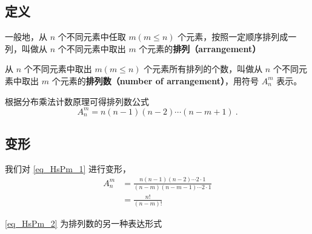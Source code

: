 
\begin{issues}
\end{issues}


\subsection{定义}
一般地，从 $n$ 个不同元素中任取 $m(m \leq n)$ 个元素，按照一定顺序排列成一列，叫做从 $n$ 个不同元素中取出 $m$ 个元素的\textbf{排列（arrangement）}

从 $n$ 个不同元素中取出 $m(m \leq n)$ 个元素所有排列的个数，叫做从 $n$ 个不同元素中取出 $m$ 个元素的\textbf{排列数（number of arrangement）}，用符号 $A_n^m$ 表示。

根据分布乘法计数原理可得排列数公式\begin{equation}\label{eq_HsPm_1}
A_n^m = n (n - 1)(n - 2) \cdots (n - m + 1)~.
\end{equation}

\subsection{变形}
我们对 \autoref{eq_HsPm_1} 进行变形，\begin{equation}\label{eq_HsPm_2}
\begin{aligned}
A_n^m &= \frac{n(n - 1)(n - 2) \cdots 2 \cdot 1}{(n - m)(n - m - 1) \cdots 2 \cdot 1}\\
&= \frac{n!}{(n - m)!}
\end{aligned}
\end{equation}

\autoref{eq_HsPm_2} 为排列数的另一种表达形式